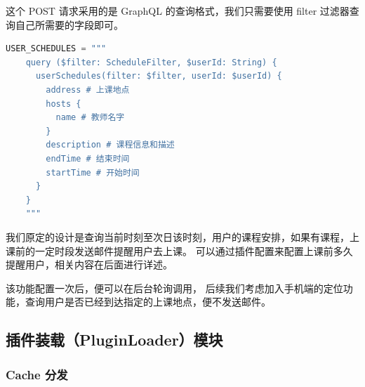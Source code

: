 \documentclass[14pt,a4paper,UTF8,twoside]{article}
\begin{document}
这个 POST 请求采用的是 GraphQL 的查询格式，我们只需要使用 filter 过滤器查询自己所需要的字段即可。

\begin{lstlisting}[language=python]
    USER_SCHEDULES = """
    query ($filter: ScheduleFilter, $userId: String) {
      userSchedules(filter: $filter, userId: $userId) {
        address # 上课地点
        hosts {
          name # 教师名字
        }
        description # 课程信息和描述
        endTime # 结束时间
        startTime # 开始时间
      }
    }
    """
\end{lstlisting}

我们原定的设计是查询当前时刻至次日该时刻，用户的课程安排，如果有课程，上课前的一定时段发送邮件提醒用户去上课。
可以通过插件配置来配置上课前多久提醒用户，相关内容在后面进行详述。

\begin{rmr}
    该功能配置一次后，便可以在后台轮询调用，
    后续我们考虑加入手机端的定位功能，查询用户是否已经到达指定的上课地点，便不发送邮件。
\end{rmr}

\newpage{}

\subsection{插件装载（PluginLoader）模块}

\subsubsection{Cache 分发}
\end{document}
